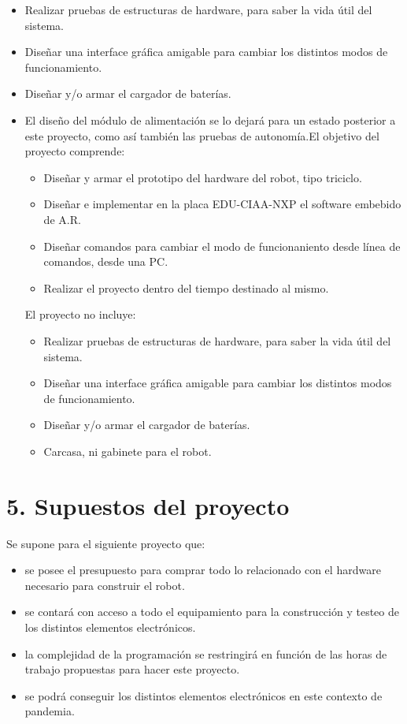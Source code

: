 \documentclass[
11pt, %
codirector, %
]{charter}
\begin{document}
\begin{itemize}
\item Realizar pruebas de estructuras de hardware, para saber la vida útil del sistema.
\item Diseñar una interface gráfica amigable para cambiar los distintos modos de funcionamiento.
\item Diseñar y/o armar el cargador de baterías.
\item El diseño del módulo de alimentación se lo dejará para un estado posterior a este proyecto, como así también las pruebas de autonomía.El objetivo del proyecto comprende:

\begin{itemize}
\item Diseñar y armar el prototipo del hardware del robot, tipo triciclo.
\item Diseñar e implementar en la placa EDU-CIAA-NXP el software embebido de A.R.
\item Diseñar comandos para cambiar el modo de funcionaniento desde línea de comandos, desde una PC. 
\item Realizar el proyecto dentro del tiempo destinado al mismo.
\end{itemize}

El proyecto no incluye:

\begin{itemize}
\item Realizar pruebas de estructuras de hardware, para saber la vida útil del sistema.
\item Diseñar una interface gráfica amigable para cambiar los distintos modos de funcionamiento.
\item Diseñar y/o armar el cargador de baterías.
\item Carcasa, ni gabinete para el robot.
\end{itemize}
\end{itemize}


\section{5. Supuestos del proyecto}
\label{sec:supuestos}

Se supone para el siguiente proyecto que:
\begin{itemize}
\item se posee el presupuesto para comprar todo lo relacionado con el hardware necesario para construir el robot. 
\item se contará con acceso a todo el equipamiento para la construcción y testeo de los distintos elementos electrónicos.
\item la complejidad de la programación se restringirá en función de las horas de trabajo propuestas para hacer este proyecto.
\item se podrá conseguir los distintos elementos electrónicos en este contexto de pandemia.
\end{itemize}
\end{document}
